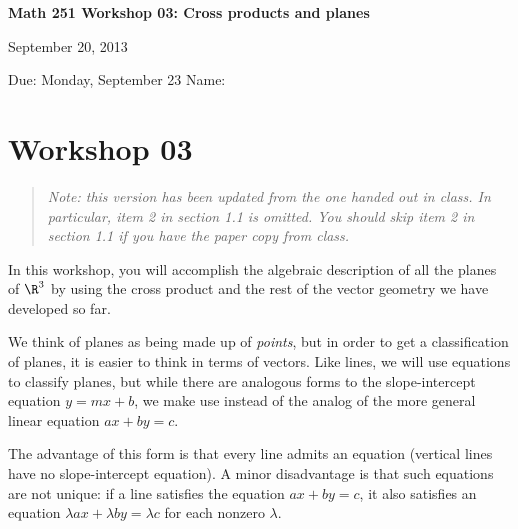 \documentclass[12pt]{exam}
\theoremstyle{definition}
\begin{document}
\lstset{language=R}
\noindent
\textbf{{\large Math 251 \hfill Workshop 03: Cross products and planes}}

\noindent
September 20, 2013 

\noindent
Due: Monday, September 23 \hfill Name: \underline{\hspace{3in}} 

\noindent

\section{Workshop 03}

\begin{quote}
\emph{Note: this version has been updated from the one handed out in class.
In particular, item 2 in section 1.1 is omitted. You should skip
item 2 in section 1.1 if you have the paper copy from class.}
\end{quote}

In this workshop, you will accomplish the algebraic description of all
the planes of $\R^3$ by using the cross product and the rest of the
vector geometry we have developed so far.


We think of planes as being made up of \emph{points}, but in order to
get a classification of planes, it is easier to think in terms of
vectors. Like lines, we will use equations to classify planes, but while
there are analogous forms to the slope-intercept equation $y = mx + b$,
we make use instead of the analog of the more general linear equation
$ax + by = c$.

The advantage of this form is that every line admits an equation
(vertical lines have no slope-intercept equation). A minor disadvantage
is that such equations are not unique: if a line satisfies the equation
$ax + by = c$, it also satisfies an equation
$\lambda ax + \lambda by = \lambda c$ for each nonzero $\lambda$.
\end{document}
